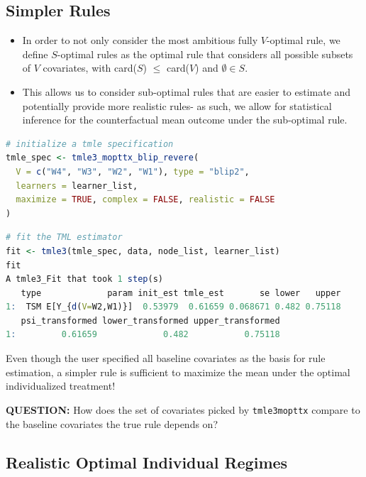 \documentclass[
  12pt, krantz2,
]{book}
\newcommand{\passthrough}[1]{#1}
\theoremstyle{definition}
\theoremstyle{definition}
\theoremstyle{definition}
\newcommand{\1}{\mathbbm{1}}
\begin{document}
\hypertarget{simpler-rules}{%
\subsection{Simpler Rules}\label{simpler-rules}}

\begin{itemize}
\item
  In order to not only consider the most ambitious fully \(V\)-optimal rule, we
  define \(S\)-optimal rules as the optimal rule that considers all possible subsets
  of \(V\) covariates, with card(\(S\)) \(\leq\) card(\(V\)) and \(\emptyset \in S\).
\item
  This allows us to consider sub-optimal rules that are easier to estimate and
  potentially provide more realistic rules- as such, we allow for statistical
  inference for the counterfactual mean outcome under the sub-optimal rule.
\end{itemize}

\begin{lstlisting}[language=R]
# initialize a tmle specification
tmle_spec <- tmle3_mopttx_blip_revere(
  V = c("W4", "W3", "W2", "W1"), type = "blip2",
  learners = learner_list,
  maximize = TRUE, complex = FALSE, realistic = FALSE
)
\end{lstlisting}

\begin{lstlisting}[language=R]
# fit the TML estimator
fit <- tmle3(tmle_spec, data, node_list, learner_list)
fit
A tmle3_Fit that took 1 step(s)
   type             param init_est tmle_est       se lower   upper
1:  TSM E[Y_{d(V=W2,W1)}]  0.53979  0.61659 0.068671 0.482 0.75118
   psi_transformed lower_transformed upper_transformed
1:         0.61659             0.482           0.75118
\end{lstlisting}

Even though the user specified all baseline covariates as the basis
for rule estimation, a simpler rule is sufficient to
maximize the mean under the optimal individualized treatment!

\textbf{QUESTION:} How does the set of covariates picked by \passthrough{\lstinline!tmle3mopttx!}
compare to the baseline covariates the true rule depends on?

\hypertarget{realistic-optimal-individual-regimes}{%
\subsection{Realistic Optimal Individual Regimes}\label{realistic-optimal-individual-regimes}}
\end{document}
